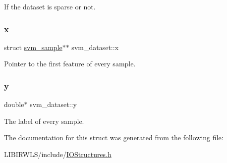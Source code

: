 If the dataset is sparse or not. \hypertarget{structsvm__dataset_ad3e266a07c610ed3f10df1bab30fd9e5}{}\label{structsvm__dataset_ad3e266a07c610ed3f10df1bab30fd9e5} 
\subsubsection{\texorpdfstring{x}{x}}
{\ttfamily struct \hyperlink{structsvm__sample}{svm\+\_\+sample}$\ast$$\ast$ svm\+\_\+dataset\+::x}

Pointer to the first feature of every sample. \hypertarget{structsvm__dataset_a2bce5da2f59f28fe18eff3f92f92c011}{}\label{structsvm__dataset_a2bce5da2f59f28fe18eff3f92f92c011} 
\subsubsection{\texorpdfstring{y}{y}}
{\ttfamily double$\ast$ svm\+\_\+dataset\+::y}

The label of every sample. 

The documentation for this struct was generated from the following file\+:\begin{DoxyCompactItemize}
\item 
L\+I\+B\+I\+R\+W\+L\+S/include/\hyperlink{IOStructures_8h}{I\+O\+Structures.\+h}\end{DoxyCompactItemize}
